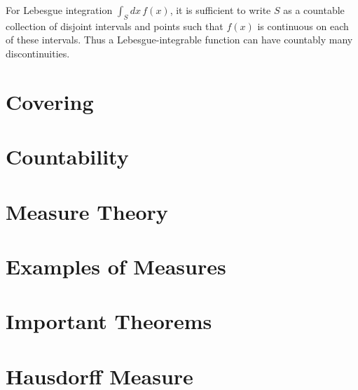 For Lebesgue integration $\int_S dx \, f(x)$, it is sufficient to
write $S$ as a countable collection of disjoint intervals and points
such that $f(x)$ is continuous on each of these intervals.  Thus a
Lebesgue-integrable function can have countably many discontinuities.
%
\section{Covering}
%
\section{Countability}
%
\section{Measure Theory}
%
\section{Examples of Measures}
%
\section{Important Theorems}
%
\section{Hausdorff Measure}


